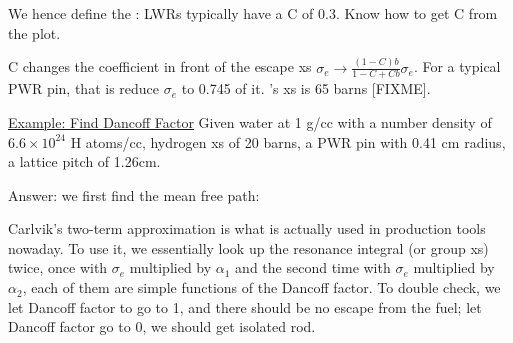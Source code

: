 \documentclass{school-22.211-notes}
\begin{document}
We hence define the :
LWRs typically have a C of 0.3. Know how to get C from the plot. 


C changes the coefficient in front of the escape xs $\sigma_e \to \frac{(1-C)b}{1-C + Cb} \sigma_e$. For a typical PWR pin, that is reduce $\sigma_e$ to 0.745 of it. 's xs is 65 barns [FIXME].

\uline{Example: Find Dancoff Factor} Given water at 1 g/cc with a number density of $6.6 \times 10^{24}$ H atoms/cc, hydrogen xs of 20 barns, a PWR pin with 0.41 cm radius, a lattice pitch of 1.26cm. 

Answer: we first find the mean free path: 



Carlvik's two-term approximation is what is actually used in production tools nowaday. To use it, we essentially look up the resonance integral (or group xs) twice, once with $\sigma_e$ multiplied by $\alpha_1$ and the second time with $\sigma_e$ multiplied by $\alpha_2$, each of them are simple functions of the Dancoff factor. To double check, we let Dancoff factor to go to 1, and there should be no escape from the fuel; let Dancoff factor go to 0, we should get isolated rod. 
\end{document}
